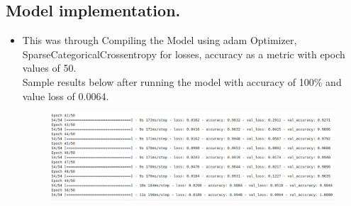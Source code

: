 \documentclass[11pt]{report}
\begin{document}
\subsection{Model implementation.}
\begin{itemize}
	\item This was through Compiling the Model using adam Optimizer, SparseCategoricalCrossentropy for losses, accuracy as a metric with epoch values of 50.\\
	Sample results below after running the model with accuracy of 100\% and value loss of 0.0064.\\
	\begin{figure}[h]
		\centerline{\small 
			\includegraphics[height=0.2\textheight]  {vt}}
	\end{figure}
	
	
\end{itemize}
\end{document}
